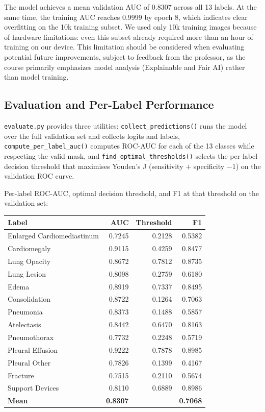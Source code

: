 \documentclass[12pt]{article}
\begin{document}
The model achieves a mean validation AUC of 0.8307 across all 13 labels. At the same time, the training AUC reaches 0.9999 by epoch 8, which indicates clear overfitting on the 10k training subset. We used only 10k training images because of hardware limitations: even this subset already required more than an hour of training on our device. This limitation should be considered when evaluating potential future improvements, subject to feedback from the professor, as the course primarily emphasizes model analysis (Explainable and Fair AI) rather than model training.

\subsection{Evaluation and Per-Label Performance}

\texttt{evaluate.py} provides three utilities: \texttt{collect\_predictions()} runs the model over the full validation set and collects logits and labels, \texttt{compute\_per\_label\_auc()} computes ROC-AUC for each of the 13 classes while respecting the valid mask, and \texttt{find\_optimal\_thresholds()} selects the per-label decision threshold that maximises Youden's J (sensitivity $+$ specificity $-1$) on the validation ROC curve.

Per-label ROC-AUC, optimal decision threshold, and F1 at that threshold on the validation set:

\begin{center}
\begin{tabular}{lrrr}
\toprule
\textbf{Label} & \textbf{AUC} & \textbf{Threshold} & \textbf{F1} \\
\midrule
Enlarged Cardiomediastinum & 0.7245 & 0.2128 & 0.5382 \\
Cardiomegaly               & 0.9115 & 0.4259 & 0.8477 \\
Lung Opacity               & 0.8672 & 0.7812 & 0.8735 \\
Lung Lesion                & 0.8098 & 0.2759 & 0.6180 \\
Edema                      & 0.8919 & 0.7337 & 0.8495 \\
Consolidation              & 0.8722 & 0.1264 & 0.7063 \\
Pneumonia                  & 0.8373 & 0.1488 & 0.5857 \\
Atelectasis                & 0.8442 & 0.6470 & 0.8163 \\
Pneumothorax               & 0.7732 & 0.2248 & 0.5719 \\
Pleural Effusion           & 0.9222 & 0.7878 & 0.8985 \\
Pleural Other              & 0.7826 & 0.1399 & 0.4167 \\
Fracture                   & 0.7515 & 0.2110 & 0.5674 \\
Support Devices            & 0.8110 & 0.6889 & 0.8986 \\
\midrule
\textbf{Mean}              & \textbf{0.8307} & & \textbf{0.7068} \\
\bottomrule
\end{tabular}
\end{center}
\end{document}

